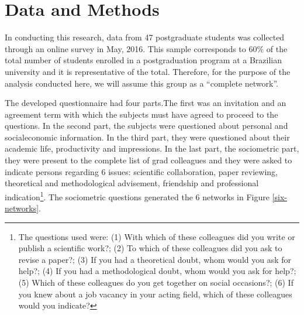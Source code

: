 \documentclass[12pt, english]{article}
\begin{document}
\section{Data and Methods}

In conducting this research, data from 47 postgraduate students was collected through an online survey in May, 2016. This sample corresponds to 60\% of the total number of students enrolled in a postgraduation program at a Brazilian university and it is representative of the total. Therefore, for the purpose of the analysis conducted here, we will assume this group as a ``complete network''.

The developed questionnaire had four parts.The first was an invitation and an agreement term with which the subjects must have agreed to proceed to the questions. In the second part, the subjects were questioned about personal and socialeconomic information. In the third part, they were questioned about their academic life, productivity and impressions. In the last part, the sociometric part, they were present to the complete list of grad colleagues and they were asked to indicate persons regarding 6 issues: scientific collaboration, paper reviewing, theoretical and methodological advisement, friendship and professional indication\footnote{The questions used were: (1) With which of these colleagues did you write or publish a scientific work?; (2) To which of these colleagues did you ask to revise a paper?; (3) If you had a theoretical doubt, whom would you ask for help?; (4) If you had a methodological doubt, whom would you ask for help?; (5) Which of these colleagues do you get together on social occasions?; (6) If you knew about a job vacancy in your acting field, which of these colleagues would you indicate?}. The sociometric questions generated the 6 networks in Figure \ref{six-networks}.
\end{document}
